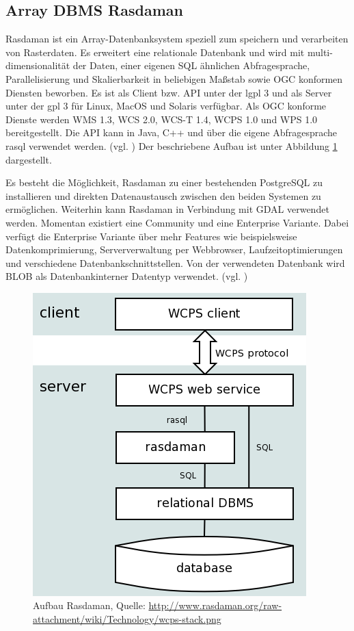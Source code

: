 \subsection{Array DBMS Rasdaman}

Rasdaman ist ein Array-Datenbanksystem speziell zum speichern und verarbeiten von Rasterdaten.
Es erweitert eine relationale Datenbank und wird mit  multi-dimensionalität der Daten, einer eigenen SQL ähnlichen Abfragesprache, Parallelisierung und Skalierbarkeit in beliebigen Maßstab sowie OGC konformen Diensten beworben.
Es ist als Client bzw. API unter der \Gls{lgpl} 3 und als Server unter der \Gls{gpl} 3 für Linux, MacOS und Solaris verfügbar.
Als OGC konforme Dienste werden WMS 1.3, WCS 2.0, WCS-T 1.4, WCPS 1.0 und WPS 1.0 bereitgestellt.
Die API kann in Java, C++ und über die eigene Abfragesprache rasql verwendet werden. (vgl. \cite{website:rasdamanogeo})
Der beschriebene Aufbau ist unter Abbildung \ref{fig:rasdaman} dargestellt.

Es besteht die Möglichkeit, Rasdaman zu einer bestehenden PostgreSQL zu installieren und direkten Datenaustausch zwischen den beiden Systemen zu ermöglichen.
Weiterhin kann Rasdaman in Verbindung mit GDAL verwendet werden.
Momentan existiert eine Community und eine Enterprise Variante. Dabei verfügt die Enterprise Variante über mehr Features wie beispielsweise Datenkomprimierung, Serververwaltung per Webbrowser, Laufzeitoptimierungen und verschiedene Datenbankschnittstellen.
Von der verwendeten Datenbank wird BLOB als Datenbankinterner Datentyp verwendet. (vgl. \cite{website:rasdamanowiki})
\begin{figure}[h]
\centering
\includegraphics[width=.4\textwidth]{Abbildungen/rasdaman-aufbau.png}
\caption[Aufbau Rasdaman]{Aufbau Rasdaman, Quelle: \url{http://www.rasdaman.org/raw-attachment/wiki/Technology/wcps-stack.png}}
\label{fig:rasdaman}
\end{figure}